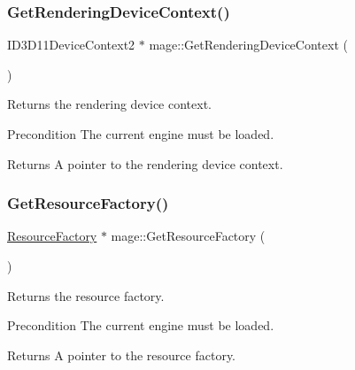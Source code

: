\subsubsection{\texorpdfstring{Get\+Rendering\+Device\+Context()}{GetRenderingDeviceContext()}}
{\footnotesize\ttfamily I\+D3\+D11\+Device\+Context2 $\ast$ mage\+::\+Get\+Rendering\+Device\+Context (\begin{DoxyParamCaption}{ }\end{DoxyParamCaption})\hspace{0.3cm}{\ttfamily [noexcept]}}

Returns the rendering device context.

\begin{DoxyPrecond}{Precondition}
The current engine must be loaded. 
\end{DoxyPrecond}
\begin{DoxyReturn}{Returns}
A pointer to the rendering device context. 
\end{DoxyReturn}
\hypertarget{namespacemage_ab3a5bd404cc56d4c62c0b995a8daddbd}{}\label{namespacemage_ab3a5bd404cc56d4c62c0b995a8daddbd} 
\subsubsection{\texorpdfstring{Get\+Resource\+Factory()}{GetResourceFactory()}}
{\footnotesize\ttfamily \hyperlink{classmage_1_1_resource_factory}{Resource\+Factory} $\ast$ mage\+::\+Get\+Resource\+Factory (\begin{DoxyParamCaption}{ }\end{DoxyParamCaption})\hspace{0.3cm}{\ttfamily [noexcept]}}

Returns the resource factory.

\begin{DoxyPrecond}{Precondition}
The current engine must be loaded. 
\end{DoxyPrecond}
\begin{DoxyReturn}{Returns}
A pointer to the resource factory. 
\end{DoxyReturn}
\hypertarget{namespacemage_a7b67bb6f38f3e787fb3561d236b88bd2}{}\label{namespacemage_a7b67bb6f38f3e787fb3561d236b88bd2} 
